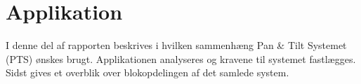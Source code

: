 \cleardoublepage
{}
\setcounter{page}{1}
\part{Applikation}
I denne del af rapporten beskrives i hvilken sammenhæng Pan \& Tilt Systemet (PTS) ønskes brugt. 
Applikationen analyseres og kravene til systemet fastlægges. 
Sidst gives et overblik over blokopdelingen af det samlede system. 



